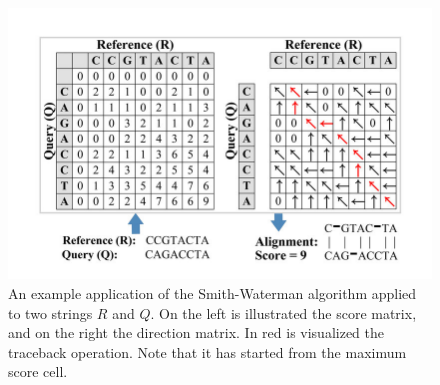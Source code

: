 \documentclass{article}
\begin{document}
\begin{figure}[H]
\centering
\includegraphics[scale=1.75]{images/sw_illustration.png}
\captionsetup{justification=centering}
\caption{\label{fig_sw_example}An example application of the Smith-Waterman algorithm applied to two strings \(R\) and \(Q\). On the left is illustrated the score matrix, and on the right the direction matrix. In red is visualized the traceback operation. Note that it has started from the maximum score cell. }
\end{figure}
\end{document}
